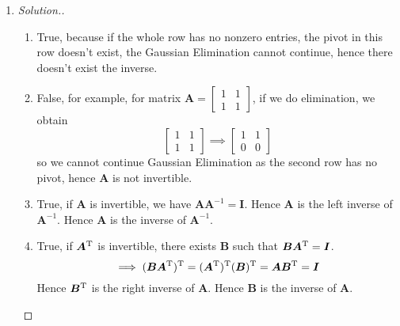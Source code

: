 \begin{enumerate}
\begin{proof}[Solution.]
Hence $c\ne 0, c\ne 2, c\ne 7.$
\end{proof}
\item
\begin{proof}[Solution.]\qquad 
\begin{enumerate}
\item
True, because if the whole row has no nonzero entries, the pivot in this row doesn't exist, the Gaussian Elimination cannot continue, hence there doesn't exist the inverse.
\item
False, for example, for matrix $\bm A = \begin{bmatrix}
1&1\\1&1
\end{bmatrix}$, if we do elimination, we obtain \[\begin{bmatrix}
1&1\\1&1
\end{bmatrix}\implies \begin{bmatrix}
1&1\\0&0
\end{bmatrix}\]so we cannot continue Gaussian Elimination as the second row has no pivot, hence $\bm A$ is not invertible.
\item
True, if $\bm A$ is invertible, we have $\bm A\bm A^{-1} = \bm I$. Hence $\bm A$ is the left inverse of $\bm A^{-1}$. Hence $\bm A$ is the inverse of $\bm A^{-1}$.
\item
True, if $\bm A^{\mathrm T}$ is invertible, there exists $\bm B$ such that $\bm B\bm A^{\mathrm T} = \bm I$.
\[
\implies (\bm B\bm A^{\mathrm T})^{\mathrm T} = (\bm A^{\mathrm T})^{\mathrm T}(\bm B)^{\mathrm T} = \bm A\bm B^{\mathrm T} = \bm I
\]
Hence $\bm B^{\mathrm T}$ is the right inverse of $\bm A$. Hence $\bm B$ is the inverse of $\bm A$.
\end{enumerate}
\end{proof}
\end{enumerate}